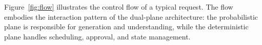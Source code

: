 

Figure~\ref{fig:flow} illustrates the control flow of a typical request.
The flow embodies the interaction pattern of the dual-plane architecture: the probabilistic plane is responsible for generation and understanding, while the deterministic plane handles scheduling, approval, and state management.


